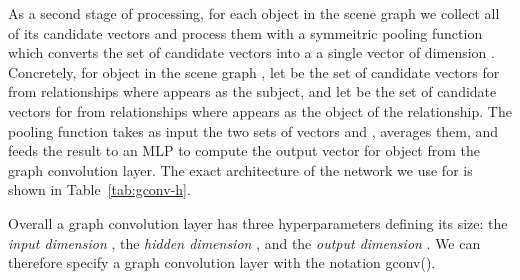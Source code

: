 \documentclass[10pt,twocolumn,letterpaper]{article}
\begin{document}
\begin{table}
  \centering
  \setlength{\tabcolsep}{1mm}
  \vspace{1mm}
  \caption{
    Network architecture for the first network  used in graph convolution;
    this single network implements the three functions , , and 
    from the main text.
  }
  \label{tab:gconv-g}
\end{table}

As a second stage of processing, for each object in the scene graph we collect all of its candidate vectors and process them with a symmeitric pooling function  which converts the set of candidate vectors into a a single vector of dimension . Concretely, for object  in the scene graph , let  be the set of candidate vectors for  from relationships where  appears as the subject, and let  be the set of candidate vectors for  from relationships where  appears as the object of the relationship. The pooling function  takes as input the two sets of vectors  and , averages them, and feeds the result to an MLP to compute the output vector  for object  from the graph convolution layer. The exact architecture of the network we use for  is shown in Table~\ref{tab:gconv-h}.

Overall a graph convolution layer has three hyperparameters defining its size: the \emph{input dimension} , the \emph{hidden dimension} , and the \emph{output dimension} . We can therefore specify a graph convolution layer with the notation gconv().
\end{document}
